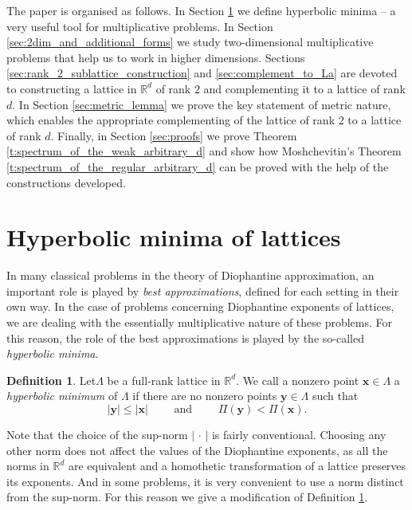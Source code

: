 \documentclass[a4paper,12pt]{article}
\theoremstyle{definition}
\newtheorem{definition}{Definition}
\theoremstyle{remark}
\theoremstyle{plain}
\renewcommand{\vec}[1]{\mathbf{#1}}
\renewcommand{\leq}{\leqslant}
\newcommand{\R}{\mathbb{R}}
\newcommand{\La}{\Lambda}
\begin{document}
The paper is organised as follows. In Section \ref{sec:hyperbolic_minima} we define hyperbolic minima -- a very useful tool for multiplicative problems. In Section \ref{sec:2dim_and_additional_forms} we study two-dimensional multiplicative problems that help us to work in higher dimensions. Sections \ref{sec:rank_2_sublattice_construction} and \ref{sec:complement_to_La} are devoted to constructing a lattice in $\R^d$ of rank $2$ and complementing it to a lattice of rank $d$. In Section \ref{sec:metric_lemma} we prove the key statement of metric nature, which enables the appropriate complementing of the lattice of rank $2$ to a lattice of rank $d$. Finally, in Section \ref{sec:proofs} we prove Theorem \ref{t:spectrum_of_the_weak_arbitrary_d} and show how Moshchevitin's Theorem \ref{t:spectrum_of_the_regular_arbitrary_d} can be proved with the help of the constructions developed.


\section{Hyperbolic minima of lattices}\label{sec:hyperbolic_minima}


In many classical problems in the theory of Diophantine approximation, an important role is played by \emph{best approximations}, defined for each setting in their own way. In the case of problems concerning Diophantine exponents of lattices, we are dealing with the essentially multiplicative nature of these problems. For this reason, the role of the best approximations is played by the so-called \emph{hyperbolic minima}.

\begin{definition}\label{def:hyperbolic_minimum}
   Let$\La$ be a full-rank lattice in $\R^d$. We call a nonzero point $\vec x\in\La$ a \emph{hyperbolic minimum} of $\La$ if there are no nonzero points $\vec y\in\La$ such that
  \[
    |\vec y|\leq|\vec x|
    \qquad\text{ and }\qquad
    \Pi(\vec y)<\Pi(\vec x).
  \] 
\end{definition}

Note that the choice of the sup-norm $|\,\cdot\,|$ is fairly conventional. Choosing any other norm does not affect the values of the Diophantine exponents, as all the norms in $\R^d$ are equivalent and a homothetic transformation of a lattice preserves its exponents. And in some problems, it is very convenient to use a norm distinct from the sup-norm. For this reason we give a modification of Definition \ref{def:hyperbolic_minimum}.
\end{document}
